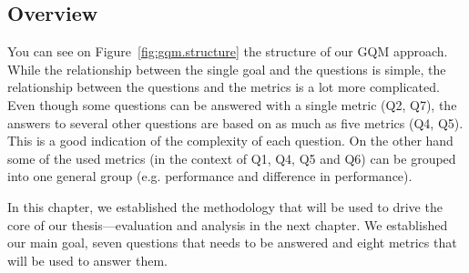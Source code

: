 \subsection{Overview}

You can see on Figure~\ref{fig:gqm.structure} the structure of our GQM approach. While the relationship between the single goal and the questions is simple, the relationship between the questions and the metrics is a lot more complicated. Even though some questions can be answered with a single metric (Q2, Q7), the answers to several other questions are based on as much as five metrics (Q4, Q5). This is a good indication of the complexity of each question. On the other hand some of the used metrics (in the context of Q1, Q4, Q5 and Q6) can be grouped into one general group (e.g. performance and difference in performance).

In this chapter, we established the methodology that will be used to drive the core of our thesis---evaluation and analysis in the next chapter. We established our main goal, seven questions that needs to be answered and eight metrics that will be used to answer them.
